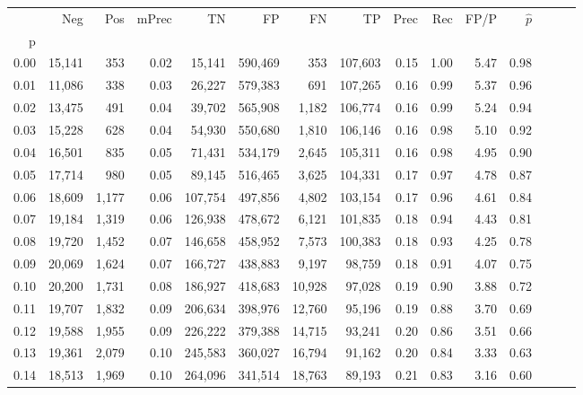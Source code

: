 \begin{tabular}{rrrrrrrrrrrrrrr}
\toprule
{} &     Neg &    Pos & mPrec &       TN &       FP &       FN &       TP &  Prec &   Rec &  FP/P & $\hat{p}$ \\
p    &         &        &       &          &          &          &          &       &       &       &           \\
\midrule
0.00 &  15,141 &    353 &  0.02 &   15,141 &  590,469 &      353 &  107,603 &  0.15 &  1.00 &  5.47 &      0.98 \\
0.01 &  11,086 &    338 &  0.03 &   26,227 &  579,383 &      691 &  107,265 &  0.16 &  0.99 &  5.37 &      0.96 \\
0.02 &  13,475 &    491 &  0.04 &   39,702 &  565,908 &    1,182 &  106,774 &  0.16 &  0.99 &  5.24 &      0.94 \\
0.03 &  15,228 &    628 &  0.04 &   54,930 &  550,680 &    1,810 &  106,146 &  0.16 &  0.98 &  5.10 &      0.92 \\
0.04 &  16,501 &    835 &  0.05 &   71,431 &  534,179 &    2,645 &  105,311 &  0.16 &  0.98 &  4.95 &      0.90 \\
0.05 &  17,714 &    980 &  0.05 &   89,145 &  516,465 &    3,625 &  104,331 &  0.17 &  0.97 &  4.78 &      0.87 \\
0.06 &  18,609 &  1,177 &  0.06 &  107,754 &  497,856 &    4,802 &  103,154 &  0.17 &  0.96 &  4.61 &      0.84 \\
0.07 &  19,184 &  1,319 &  0.06 &  126,938 &  478,672 &    6,121 &  101,835 &  0.18 &  0.94 &  4.43 &      0.81 \\
0.08 &  19,720 &  1,452 &  0.07 &  146,658 &  458,952 &    7,573 &  100,383 &  0.18 &  0.93 &  4.25 &      0.78 \\
0.09 &  20,069 &  1,624 &  0.07 &  166,727 &  438,883 &    9,197 &   98,759 &  0.18 &  0.91 &  4.07 &      0.75 \\
0.10 &  20,200 &  1,731 &  0.08 &  186,927 &  418,683 &   10,928 &   97,028 &  0.19 &  0.90 &  3.88 &      0.72 \\
0.11 &  19,707 &  1,832 &  0.09 &  206,634 &  398,976 &   12,760 &   95,196 &  0.19 &  0.88 &  3.70 &      0.69 \\
0.12 &  19,588 &  1,955 &  0.09 &  226,222 &  379,388 &   14,715 &   93,241 &  0.20 &  0.86 &  3.51 &      0.66 \\
0.13 &  19,361 &  2,079 &  0.10 &  245,583 &  360,027 &   16,794 &   91,162 &  0.20 &  0.84 &  3.33 &      0.63 \\
0.14 &  18,513 &  1,969 &  0.10 &  264,096 &  341,514 &   18,763 &   89,193 &  0.21 &  0.83 &  3.16 &      0.60 \\

\end{tabular}
